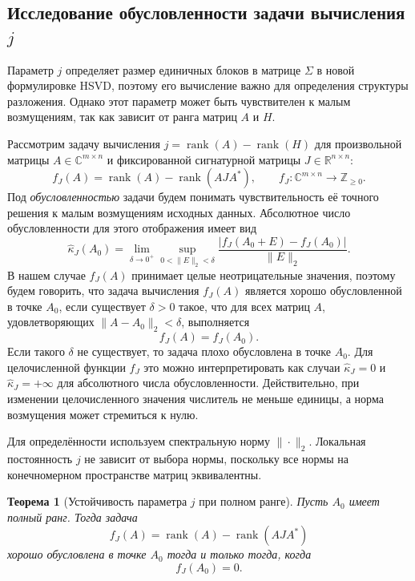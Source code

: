 \documentclass[a4paper,12pt]{article}
\DeclareMathOperator{\rank}{rank}
\theoremstyle{csstyle}
\newtheorem{theorem}{Теорема}[section]
\newcommand{\HSVDComplex}{\mathbb C}
\begin{document}
\subsection{Исследование обусловленности задачи вычисления $j$}
\label{rev:subsec-conditioned}
Параметр $j$ определяет размер единичных блоков в матрице $\Sigma$ в новой формулировке HSVD, поэтому его вычисление важно для определения структуры разложения. Однако этот параметр может быть чувствителен к малым возмущениям, так как зависит от ранга матриц $A$ и $H$.

Рассмотрим задачу вычисления $j = \rank(A) - \rank(H)$ для произвольной матрицы $A \in \HSVDComplex^{m\times n}$ и фиксированной сигнатурной матрицы $J \in \mathbb R^{n\times n}$:
\[
f_J(A) = \rank(A)-\rank(AJA^*),\qquad f_J: \HSVDComplex^{m\times n} \to \mathbb Z_{\geq 0}.
\]
Под \textit{обусловленностью} задачи будем понимать чувствительность её точного решения
к малым возмущениям исходных данных. Абсолютное число обусловленности
для этого отображения имеет вид
\[
\hat\kappa_J(A_0)=\lim_{\delta\to0^+}
\sup_{0<\|E\|_2<\delta}\frac{|f_J(A_0+E)-f_J(A_0)|}{\|E\|_2}.
\]
В нашем случае $f_J(A)$ принимает целые неотрицательные значения, поэтому будем говорить, что задача вычисления $f_J(A)$ является хорошо обусловленной в точке \(A_0\), если существует \(\delta > 0\) такое, что 
для всех матриц \(A\), удовлетворяющих \(\|A - A_0\|_2 < \delta\), выполняется
\[
f_J(A) = f_J(A_0).
\]
Если такого \(\delta\) не существует, то задача плохо обусловлена в точке \(A_0\). Для целочисленной функции $f_J$ это можно интерпретировать как случаи $\hat\kappa_J = 0$ и $\hat\kappa_J = +\infty$ для абсолютного числа обусловленности. Действительно, при изменении целочисленного значения числитель не меньше единицы, а норма возмущения может стремиться к нулю.

Для определённости используем спектральную норму $\|\cdot\|_2$.
Локальная постоянность $j$ не зависит от выбора нормы, поскольку все
нормы на конечномерном пространстве матриц эквивалентны.

\begin{theorem}[Устойчивость параметра $j$ при полном ранге]\label{rev:th-fullRank}
    Пусть $A_0$ имеет полный ранг. Тогда задача
    \[
    f_J(A)=\rank(A)-\rank(AJA^*)
    \]
    хорошо обусловлена в точке $A_0$ тогда и только тогда, когда
    \[
    f_J(A_0)=0.
    \]
\end{theorem}
\end{document}
